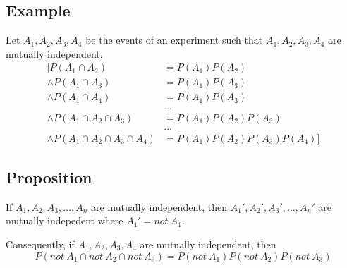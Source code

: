 \documentclass[letterpaper, 12pt]{math}
\begin{document}
\subsection*{Example}
Let \( A_{1}, A_{2}, A_{3}, A_{4} \) be the events of an experiment such that
\( A_{1}, A_{2}, A_{3}, A_{4} \) are mutually independent.
\begin{align*}
  \bigg[P(A_{1} \cap A_{2}) &= P(A_{1})P(A_{2}) \\
  \wedge P(A_{1} \cap A_{3}) &= P(A_{1})P(A_{3}) \\
  \wedge P(A_{1} \cap A_{4}) &= P(A_{1})P(A_{3}) \\
  & \dots \\
  \wedge P(A_{1} \cap A_{2} \cap A_{3}) &= P(A_{1})P(A_{2})P(A_{3}) \\
  & \dots \\
  \wedge P(A_{1} \cap A_{2} \cap A_{3} \cap A_{4}) &=
    P(A_{1})P(A_{2})P(A_{3})P(A_{4}) \bigg]
\end{align*}

\subsection*{Proposition}
If \( A_{1},A_{2},A_{3},\dots,A_{n} \) are mutually independent, then
\( A_{1}',A_{2}',A_{3}',\dots,A_{n}' \) are mutually indepedent where
\( A_{1}' = not\ A_{1} \). \par
Consequently, if \( A_{1},A_{2},A_{3},A_{4} \) are mutually independent, then
\[ P(not\ A_{1} \cap not\ A_{2} \cap not\ A_{3}) =
   P(not\ A_{1})P(not\ A_{2})P(not\ A_{3}) \]
\end{document}
